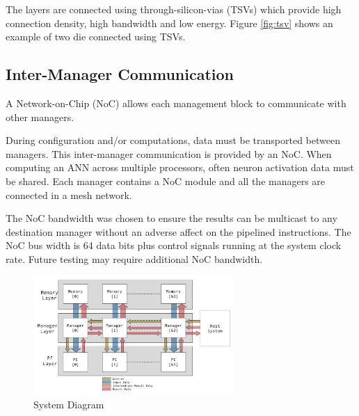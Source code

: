 \documentclass[journal]{IEEEtran}
\begin{document}
The layers are connected using through-silicon-vias (TSVs) which provide high connection density, high bandwidth and low energy.
Figure \ref{fig:tsv} shows an example of two die connected using TSVs.

\subsection{Inter-Manager Communication}
\label{ssec:Inter-Manager Communication}

A Network-on-Chip (NoC) allows each management block to communicate with other managers.

During configuration and/or computations, data must be transported between managers. This inter-manager communication is provided by an NoC.
When computing an ANN across multiple processors, often neuron activation data must be shared. 
Each manager contains a NoC module and all the managers are connected in a mesh network.

The NoC bandwidth was chosen to ensure the results can be multicast to any destination manager without an adverse affect on the pipelined instructions.
The NoC bus width is 64 data bits plus control signals running at the system clock rate. Future testing may require additional NoC bandwidth.

\begin{figure}[!t]
\centering
\captionsetup{justification=centering}
\centerline{
\mbox{\includegraphics[width=3.0in]{FlowDiagram.jpg}}
}
\caption{System Diagram}
\label{fig:FlowDiagram}
\end{figure}
\end{document}

